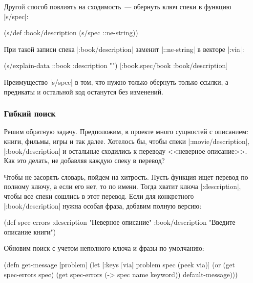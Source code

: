 Другой способ повлиять на сходимость~--- обернуть ключ спеки в функцию
\spverb|s/spec|:

\begin{english}
  \begin{clojure}
(s/def :book/description (s/spec ::ne-string))
  \end{clojure}
\end{english}

При такой записи спека \spverb|:book/description| заменит \spverb|::ne-string| в
векторе \spverb|:via|:

\begin{english}
  \begin{clojure}
(s/explain-data ::book {:description ""})
[:book.spec/book :book/description]
  \end{clojure}
\end{english}

Преимущество \spverb|s/spec| в том, что нужно только обернуть только ссылки, а
предикаты и остальной код останутся без изменений.

\subsubsection{Гибкий поиск}

Решим обратную задачу. Предположим, в проекте много сущностей с описанием:
книги, фильмы, игры и так далее. Хотелось бы, чтобы спеки
\spverb|:movie/description|, \spverb|:book/description| и остальные сходились к
переводу <<неверное описание>>. Как это делать, не добавляя каждую спеку в
перевод?

Чтобы не засорять словарь, пойдем на хитрость. Пусть функция ищет перевод по
полному ключу, а если его нет, то по имени. Тогда хватит ключа
\spverb|:description|, чтобы все спеки сошлись в этот перевод. Если для
конкретного \spverb|:book/description| нужна особая фраза, добавим полную
версию:

  \begin{clojure}
(def spec-errors
  {:description "Неверное описание"
   :book/description "Введите описание книги"})
  \end{clojure}

\noindent
Обновим поиск с учетом неполного ключа и фразы по умолчанию:

\begin{english}
  \begin{clojure}
(defn get-message
  [problem]
  (let [{:keys [via]} problem
        spec (peek via)]
    (or (get spec-errors spec)
        (get spec-errors (-> spec name keyword))
        default-message)))
  \end{clojure}
\end{english}

